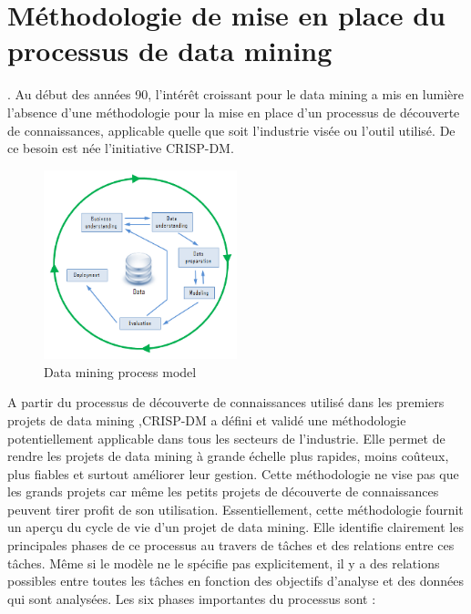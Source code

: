 \section{Méthodologie de mise en place du processus de data mining\cite{DMProces}}.
Au début des années 90, l'intérêt croissant  pour le data mining a mis en lumière l'absence d'une méthodologie pour la mise en place d'un processus de découverte de connaissances, applicable quelle que soit l'industrie visée ou l'outil utilisé. De ce besoin est née l'initiative \ac{CRISP-DM}.
\begin{figure}[ht]
	\centering
	\includegraphics[width=0.5\textwidth]{fig/CRISP_tb.png}
	\caption{Data mining process model}
	\label{fig:imageCrisp}
\end{figure} 
A partir du processus de découverte de connaissances utilisé dans les premiers projets de data mining ,\ac{CRISP-DM} a défini et validé une méthodologie potentiellement applicable dans tous les secteurs de l'industrie. Elle permet de rendre les projets de data mining à grande échelle plus rapides, moins coûteux, plus fiables et surtout améliorer leur gestion. Cette méthodologie ne vise pas que les grands projets car même les petits projets de découverte de connaissances peuvent tirer profit de son utilisation.
Essentiellement, cette méthodologie fournit un aperçu du cycle de vie d'un projet de data mining. Elle identifie clairement les principales phases de ce processus au travers de tâches et des relations entre ces tâches. Même si le modèle ne le spécifie pas explicitement, il y a des relations possibles entre toutes les tâches en fonction des objectifs d'analyse et des données qui sont analysées.
Les six phases importantes du processus sont :
